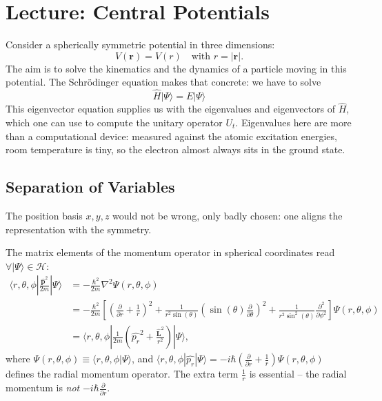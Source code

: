
\section{Lecture: Central Potentials}
Consider a spherically symmetric potential in three dimensions:
\begin{equation}
	V(\mathbf{r}) = V(r) \quad\text{with $r = |\mathbf{r}|$.}
\end{equation}
The aim is to solve the kinematics and the dynamics of a particle moving in this potential. The Schrödinger equation makes that concrete: we have to solve
\begin{equation}
	\widehat{H}|\Psi\rangle = E|\Psi\rangle
\end{equation}
This eigenvector equation supplies us with the eigenvalues and eigenvectors of $\widehat{H}$, which one can use to compute the unitary operator $U_t$. Eigenvalues here are more than a computational device: measured against the atomic excitation energies, room temperature is tiny, so the electron almost always sits in the ground state.

\subsection{Separation of Variables}
The position basis $x,y,z$ would not be wrong, only badly chosen: one aligns the representation with the symmetry.

The matrix elements of the momentum operator in spherical coordinates read $\forall |\Psi\rangle \in \mathcal{H}$:
\begin{equation}
	\begin{split}
		\langle r,\theta,\phi|\frac{\widehat{\mathbf{p}}^2}{2m}|\Psi\rangle &= -\frac{\hbar^2}{2m}\nabla^2 \Psi(r,\theta,\phi) \\
		&= -\frac{\hbar^2}{2m} \left[\left(\frac{\partial}{\partial r} + \frac1r\right)^2 + \frac{1}{r^2\sin(\theta)}\left(\sin(\theta)\frac{\partial}{\partial \theta}\right)^2 +  \frac{1}{r^2\sin^2(\theta)}\frac{\partial^2}{\partial \phi^2}\right]\Psi(r,\theta,\phi) \\
		&= \langle r,\theta,\phi|\frac{1}{2m}\left(\widehat{p_r}^2 + \frac{\widehat{\mathbf{L}}^2}{r^2}\right)|\Psi\rangle,
	\end{split}
\end{equation}
where $\Psi(r,\theta,\phi) \equiv \langle r,\theta,\phi|\Psi\rangle$, and $\langle r,\theta,\phi|\widehat{p_r}|\Psi\rangle = -i\hbar \left(\frac{\partial}{\partial r} + \frac1r\right)\Psi(r,\theta,\phi)$ defines the radial momentum operator. The extra term $\frac1r$ is essential -- the radial momentum is \emph{not} $-i\hbar\frac{\partial}{\partial r}$.

